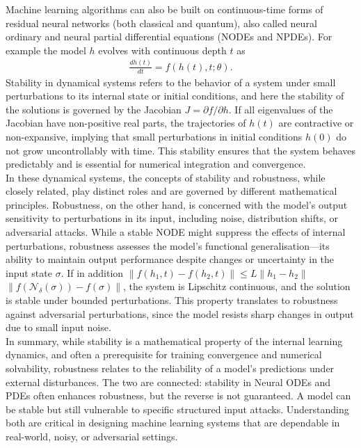 \documentclass[onecolumn,prx, superscriptaddress,longbibliography,margin=1mm 11pt]{revtex4-2}
\begin{document}
Machine learning algorithms can also be built on continuous-time forms of residual neural networks (both classical and quantum), also called neural ordinary and neural partial differential equations (NODEs and NPDEs). For example the model $h$ evolves with continuous depth $t$ as
\begin{align}
    \frac{dh(t)}{dt}=f(h(t), t; \theta). 
\end{align}
 Stability in dynamical systems refers to the behavior of a system under small perturbations to its internal state or initial conditions, and here the stability of the solutions is governed by the Jacobian $J=\partial f/ \partial h$. If all eigenvalues of the Jacobian have non-positive real parts, the trajectories of $h(t)$ are contractive or non-expansive, implying that small perturbations in initial conditions $h(0)$ do not grow uncontrollably with time. This stability ensures that the system behaves predictably and is essential for numerical integration and convergence. \\
 
 In these dynamical systems, the concepts of stability and robustness, while closely related, play distinct roles and are governed by different mathematical principles. Robustness, on the other hand, is concerned with the model’s output sensitivity to perturbations in its input, including noise, distribution shifts, or adversarial attacks. While a stable NODE might suppress the effects of internal perturbations, robustness assesses the model’s functional generalisation—its ability to maintain output performance despite changes or uncertainty in the input state $\sigma$. If in addition $\|f(h_1, t)-f(h_2,t)\| \leq L\|h_1-h_2\|$ $\|f(\mathcal{N}_{\delta}(\sigma))-f(\sigma)\|$, the system is Lipschitz continuous, and the solution is stable under bounded perturbations. This property translates to robustness against adversarial perturbations, since the model resists sharp changes in output due to small input noise. \\

In summary, while stability is a mathematical property of the internal learning dynamics, and often a prerequisite for training convergence and numerical solvability, robustness relates to the reliability of a model’s predictions under external disturbances. The two are connected: stability in Neural ODEs and PDEs often enhances robustness, but the reverse is not guaranteed. A model can be stable but still vulnerable to specific structured input attacks. Understanding both are critical in designing machine learning systems that are dependable in real-world, noisy, or adversarial settings.\\
\end{document}
